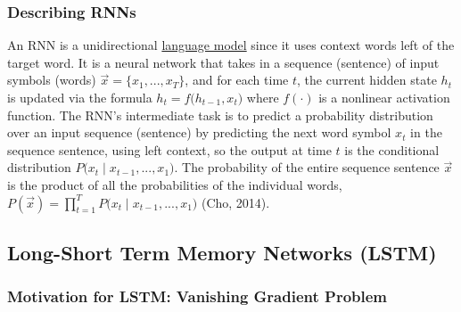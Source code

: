 \subsubsection{Describing RNNs}

An RNN is a unidirectional \hyperref[sec:LanguageModels]{language model} since it uses context words left of the target word. It is a neural network that takes in a sequence (sentence) of input symbols (words) $\overrightarrow{x} = \{ x_1, ..., x_T\}$, and for each time $t$, the current hidden state $h_t$ is updated via the formula $h_t = f \Big( h_{t-1}, x_t \Big)$ where $f(\cdot)$ is a nonlinear activation function. The RNN's intermediate task is to predict a probability distribution over an input sequence (sentence) by predicting the next word symbol $x_t$ in the sequence sentence, using left context, so the output at time $t$ is the conditional distribution $P \Big(x_t \; | \; x_{t-1}, ..., x_1 \Big)$. The probability of the entire sequence sentence $\overrightarrow{x}$ is the product of all the probabilities of the individual words, $P(\overrightarrow{x}) = \prod_{t=1}^T P \Big(x_t \; | \; x_{t-1}, ..., x_1 \Big)$ (Cho, 2014). 


    
\subsection{Long-Short Term Memory Networks (LSTM)} \label{sec:LSTM}

\subsubsection{Motivation for LSTM: Vanishing Gradient Problem} \label{sec:ProblemWithRNNs}


